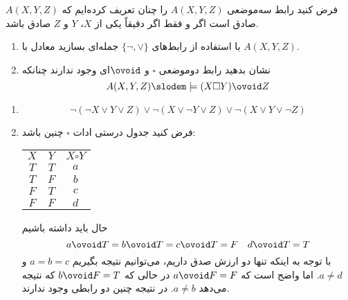 فرض کنید رابط سه‌موضعی $A(X,Y,Z)$ را چنان تعریف کرده‌ایم که $A(X,Y,Z)$ صادق است اگر و فقط اگر دقیقاً یکی از $X$، $Y$ و $Z$ صادق باشد.

\begin{enumerate}[label=(\alph*)]
\item
با استفاده از رابط‌های
$\{\neg,\vee\}$
جمله‌ای بسازید معادل با
$A(X,Y,Z)$.
\item
نشان بدهید رابط دوموضعی $\square$ و $\ovoid$ای وجود ندارند چنانکه
$$
A(X,Y,Z)\slodem\models(X\square Y)\ovoid Z
$$
\end{enumerate}\quad\vspace{-9mm}
\begin{ans}
\begin{enumerate}
\item
$$
\neg(\neg X\vee Y\vee Z)\vee\neg(X\vee\neg Y\vee Z)\vee\neg(X\vee Y\vee\neg Z)
$$
\item
فرض کنید جدول درستی ادات
$\square$
چنین باشد:

\begin{tabular}{c|c|c}
$X$ & $Y$ & $X\square Y$ \\
$T$ & $T$ & $a$ \\
$T$ & $F$ & $b$ \\
$F$ & $T$ & $c$ \\
$F$ & $F$ & $d$ \\
\end{tabular}

حال باید داشته باشیم
$$
a\ovoid T = b\ovoid T = c\ovoid T = F \quad d\ovoid T = T
$$
با توجه به اینکه تنها دو ارزش صدق داریم، می‌توانیم نتیجه بگیریم
$a=b=c$
و
$a\neq d$.
اما واضح است که
$a\ovoid F=F$
در حالی که
$b\ovoid F=T$
که نتیجه می‌دهد
$a\neq b$.
در نتیجه چنین دو رابطی وجود ندارند.

\end{enumerate}
\end{ans}
